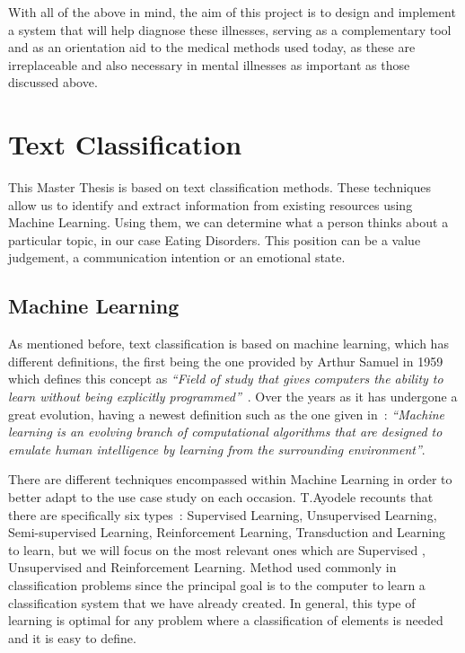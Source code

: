 With all of the above in mind, the aim of this project is to design and implement a system that will help diagnose these illnesses, serving as a complementary tool and as an orientation aid to the medical methods used today, as these are irreplaceable and also necessary in mental illnesses as important as those discussed above.



\section{Text Classification}
This Master Thesis is based on text classification methods. These techniques allow us to identify and extract information from existing resources using Machine Learning. Using them, we can determine what a person thinks about a particular topic, in our case Eating Disorders. This position can be a value judgement, a communication intention or an emotional state.

\subsection{Machine Learning}
As mentioned before, text classification is based on machine learning, which has different definitions, the first being the one provided by Arthur Samuel in 1959 which defines this concept as \textit{``Field of study that gives computers the ability to learn without being explicitly programmed''}~\cite{samuel1959some}.
Over the years as it has undergone a great evolution, having a newest definition such as the one given in~\cite{el2015machine}: \textit{``Machine learning is an evolving branch of computational algorithms that are designed to emulate human intelligence by learning from the surrounding environment''}.

There are different techniques encompassed within Machine Learning in order to better adapt to the use case study on each occasion. T.Ayodele recounts that there are specifically six types~\cite{ayodele2010types}: Supervised Learning, Unsupervised Learning, Semi-supervised Learning,  Reinforcement Learning, Transduction and Learning to learn, but we will focus on the most relevant ones which are Supervised , Unsupervised and Reinforcement Learning.
Method used commonly in classification problems since the principal goal is to the computer to learn a classification system that we have already created. In general, this type of learning is optimal for any problem where a classification of elements is needed and it is easy to define. 

